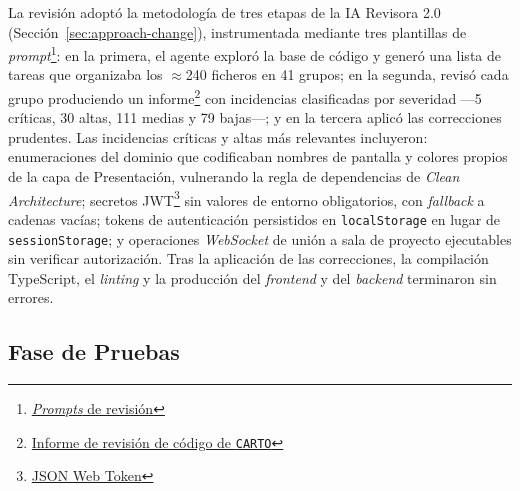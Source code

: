 La revisión adoptó la metodología de tres etapas de la \ac{IA} Revisora 2.0 (Sección~\ref{sec:approach-change}), instrumentada mediante tres plantillas de \textit{prompt}\footnote{\href{https://github.com/alu0101549491/TFG-Fabian-Gonzalez-Lence/tree/main/resources/prompts/4-CartographicProjectManager/4-RevisionDelCodigo}{\textit{Prompts} de revisión}}: en la primera, el agente exploró la base de código y generó una lista de tareas que organizaba los $\approx$240 ficheros en 41 grupos; en la segunda, revisó cada grupo produciendo un informe\footnote{\href{https://github.com/alu0101549491/TFG-Fabian-Gonzalez-Lence/blob/main/projects/4-CartographicProjectManager/docs/review/reports/CODE_REVIEW_REPORT.md}{Informe de revisión de código de \texttt{CARTO}}} con incidencias clasificadas por severidad ---5 críticas, 30 altas, 111 medias y 79 bajas---; y en la tercera aplicó las correcciones prudentes. Las incidencias críticas y altas más relevantes incluyeron: enumeraciones del dominio que codificaban nombres de pantalla y colores propios de la capa de Presentación, vulnerando la regla de dependencias de \textit{Clean Architecture}; secretos JWT\footnote{\href{https://es.wikipedia.org/wiki/JSON_Web_Token}{JSON Web Token}} sin valores de entorno obligatorios, con \textit{fallback} a cadenas vacías; tokens de autenticación persistidos en \texttt{localStorage} en lugar de \texttt{sessionStorage}; y operaciones \textit{WebSocket} de unión a sala de proyecto ejecutables sin verificar autorización. Tras la aplicación de las correcciones, la compilación TypeScript, el \textit{linting} y la producción del \textit{frontend} y del \textit{backend} terminaron sin errores.

\subsection{Fase de Pruebas}

